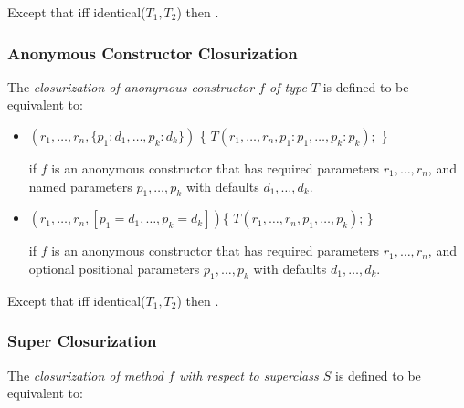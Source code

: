 \documentclass{article}
\newcommand{\code}[1]{{\sf #1}}
\begin{document}
\LMHash{}
Except that iff  \code{identical($T_1, T_2$)}  then  .


\subsubsection{Anonymous Constructor Closurization}

\LMHash{}
The {\em closurization of anonymous constructor $f$ of type $T$} is defined to be equivalent to:
\begin{itemize}
\item  
\begin{dartCode}
$(r_1, \ldots, r_n, \{p_1 : d_1, \ldots , p_k : d_k\})$ \{
  \RETURN{} \NEW{} $T(r_1, \ldots, r_n, p_1: p_1, \ldots, p_k: p_k);$
\} 
\end{dartCode}

if $f$ is an anonymous constructor that has required parameters $r_1, \ldots, r_n$, and named parameters $p_1, \ldots, p_k$ with defaults $d_1, \ldots, d_k$.
\item 
\begin{dartCode}
$(r_1, \ldots, r_n, [p_1 = d_1, \ldots , p_k = d_k])$\{
  \RETURN{} \NEW{} $T(r_1, \ldots, r_n, p_1, \ldots, p_k)$;
\}
\end{dartCode}

if $f$ is an anonymous constructor that has required parameters $r_1, \ldots, r_n$, and optional positional parameters $p_1, \ldots, p_k$ with defaults $d_1, \ldots, d_k$.
\end{itemize}

\LMHash{}
Except that iff  \code{identical($T_1, T_2$)}  then  .


\subsubsection{Super Closurization}

\LMHash{}
The {\em closurization of method $f$ with respect to superclass $S$} is defined to be equivalent to:
\end{document}
